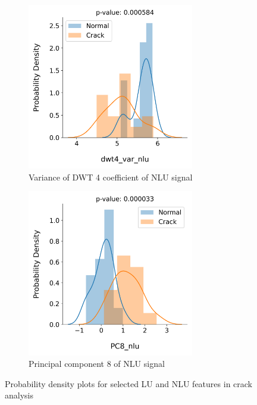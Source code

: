 \begin{figure}[tb]
\begin{subfigure}[t]{0.49\linewidth}
    \centering
    \includegraphics[width=0.8\textwidth]{fig/crack_detection_dwt4_var_nlu.png}
    \caption{Variance of DWT 4 coefficient of NLU signal}
  \end{subfigure}
  \begin{subfigure}[t]{0.49\linewidth}
    \centering
    \includegraphics[width=0.8\textwidth]{fig/crack_detection_PC8_nlu.png}
    \caption{Principal component 8 of NLU signal}
  \end{subfigure}

  \caption{Probability density plots for selected LU and NLU features in crack analysis}
  \label{fig: crack detection feat dist}
\end{figure}